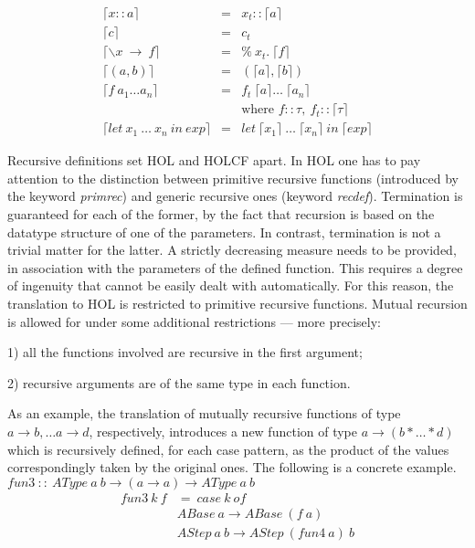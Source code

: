 \documentclass{llncs}
\begin{document}
$$\begin{array}{lcl} 
  \lceil x::a \rceil & = & x_{t}::\lceil a \rceil \\
  \lceil c \rceil & = & c_{t} \\
  \lceil \backslash x \ \to \ f \rceil & = & \% \ x_{t}. \ \lceil f \rceil \\
  \lceil (a,b) \rceil & = & (\lceil a \rceil, \lceil b \rceil) \\
  \lceil f \ a_{1} \ldots a_{n} \rceil & = & f_{t} \ \lceil a \rceil \ldots \  \lceil a_{n} \rceil \\
  & & \mbox{where } f::\tau, \ f_{t}::\lceil \tau \rceil \\
  \lceil let \ x_{1} \ \dots \ x_{n} \ in \ exp \rceil & = 
  & let \ \lceil x_{1} \rceil \ \dots \ \lceil x_{n} \rceil \ in \ \lceil exp \rceil 
\end{array}$$

\noindent Recursive definitions set HOL and HOLCF apart. In HOL one has to
pay attention to the distinction between primitive recursive functions
(introduced by the keyword \emph{primrec}) and generic recursive ones (keyword
\emph{recdef}).  Termination is guaranteed for each of the former, by the fact
that recursion is based on the datatype structure of one of the parameters. In
contrast, termination is not a trivial matter for the latter. A strictly
decreasing measure needs to be provided, in association with the parameters of
the defined function. This requires a degree of ingenuity that cannot be
easily dealt with automatically. For this reason, the translation to HOL is
restricted to primitive recursive functions. Mutual recursion is allowed for
under some additional restrictions --- more precisely:

1) all the functions involved are recursive in the first argument;

2) recursive arguments are of the same type in each function.  

\noindent 
As an example, the translation of mutually recursive functions of type $a
\rightarrow b, \ldots a \rightarrow d$, respectively, introduces a new
function of type $a \rightarrow (b * \ldots * d)$ which is recursively
defined, for each case pattern, as the product of the values correspondingly
taken by the original ones. The following is a concrete example.
\\

\noindent $ fun3 \ :: \ AType \ a \ b \to (a \to a) \to AType \ a \ b $
$$\begin{array}{ll}
fun3 \ k \ f & = \ case \ k \ of \\
  & ABase \ a \to ABase \ (f \ a) \\
  & AStep \ a \ b \to AStep \ (fun4 \ a) \ b \\
\end{array}$$
   
\end{document}
